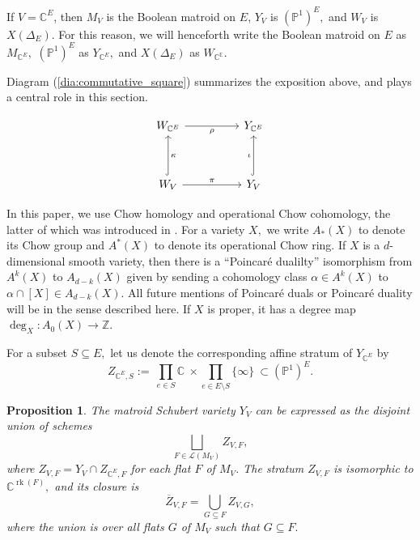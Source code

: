 \documentclass{amsart}
\theoremstyle{plain}
\newtheorem{proposition}[theorem]{Proposition}
\theoremstyle{definition}
\newcommand{\rk}{\operatorname{rk}}
\begin{document}
If $V = \mathbb{C}^E$, then $M_V$ is the Boolean matroid on $E$, $Y_V$ is $(\mathbb{P}^1)^E,$ and $W_V$ is $X(\Delta_E).$ For this reason, we will henceforth write the Boolean matroid on $E$ as $M_{\mathbb{C}^E},$ $(\mathbb{P}^1)^E$ as $Y_{\mathbb{C}^E},$ and $X(\Delta_E)$ as $W_\mathbb{C^E}.$ 

Diagram (\ref{dia:commutative_square}) summarizes the exposition above, and plays a central role in this section.

\begin{equation}
\label{dia:commutative_square}
\begin{tikzcd}
	{W_{\mathbb{C}^E}} && {Y_{\mathbb{C}^E}} \\
	\\
	{W_V} && {Y_V}
	\arrow["{\rho}"', from=1-1, to=1-3]
	\arrow["{\kappa}"', hook, from=3-1, to=1-1]
	\arrow["{\pi}", from=3-1, to=3-3]
	\arrow["{\iota}", hook, from=3-3, to=1-3]
\end{tikzcd}
\end{equation}

In this paper, we use Chow homology and operational Chow cohomology, the latter of which was introduced in \cite{operational_chow_cohomology}. For a variety $X,$ we write $A_*(X)$ to denote its Chow group and $A^*(X)$ to denote its operational Chow ring. If $X$ is a $d$-dimensional smooth variety, then there is a ``Poincar\'e dualilty'' isomorphism from $A^k(X)$ to $A_{d-k}(X)$ given by sending a cohomology class $\alpha \in A^k(X)$ to $\alpha \cap [X] \in A_{d-k}(X) $. All future mentions of Poincar\'e duals or Poincar\'e duality will be in the sense described here. If $X$ is proper, it has a degree map $\deg_X: A_0(X) \to \mathbb{Z}.$

For a subset $S \subseteq E,$ let us denote the corresponding affine stratum of $Y_{\mathbb{C}^E}$ by
\[Z_{\mathbb{C}^E, S} := \ \prod_{e \in S} \mathbb{C} \ \times \prod_{e \in E \setminus S} \{\infty\} \ \subset (\mathbb{P}^1)^E.\]

\begin{proposition}
\label{lem:stratification}
\cite[Proposition 4.10]{proudfoot_2018}
The matroid Schubert variety $Y_V$ can be expressed as the disjoint union of schemes
\[\bigsqcup_{F \in \mathcal{L}(M_V)} Z_{V,F},\]
where $Z_{V,F} = Y_V \cap Z_{\mathbb{C}^E,F} $ for each flat $F$ of $M_V$. The stratum $Z_{V,F}$ is isomorphic to $\mathbb{C}^{\rk(F)},$ and its closure is
\[\overline{Z}_{V,F} = \bigcup_{G \subseteq F} Z_{V,G},\]
where the union is over all flats $G$ of $M_V$ such that $G \subseteq F.$
\end{proposition}
\end{document}
